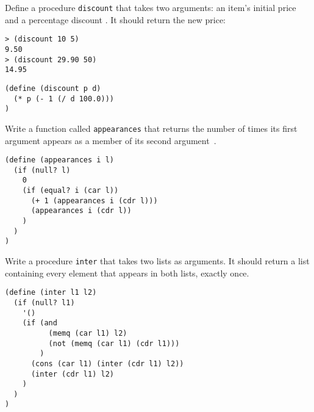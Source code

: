 \begin{questions}
\begin{solution}
\end{solution}


\question
Define a procedure \texttt{discount} that takes two arguments: an item’s initial price and a percentage discount \cite{simplyscheme}.
It should return the new price:
\begin{verbatim}
> (discount 10 5)
9.50
> (discount 29.90 50)
14.95
\end{verbatim}


\begin{solution}
  \begin{verbatim}
(define (discount p d)
  (* p (- 1 (/ d 100.0)))
)
  \end{verbatim}
\end{solution}

\question
Write a function called \texttt{appearances} that returns the number of times its first argument appears as a member of its second argument~\cite{simplyscheme}.

\begin{solution}
  \begin{verbatim}
(define (appearances i l)
  (if (null? l)
    0
    (if (equal? i (car l))  
      (+ 1 (appearances i (cdr l)))
      (appearances i (cdr l))
    )
  )
)   
  \end{verbatim}
\end{solution}

\question
Write a procedure \texttt{inter} that takes two lists as arguments.
It should return a list containing every element that appears in both lists, exactly once.

\begin{solution}
  \begin{verbatim}
(define (inter l1 l2)
  (if (null? l1)
    '()
    (if (and 
          (memq (car l1) l2)
          (not (memq (car l1) (cdr l1)))
        )
      (cons (car l1) (inter (cdr l1) l2))
      (inter (cdr l1) l2)
    )
  )
)
  \end{verbatim}
\end{solution}


\end{questions}
